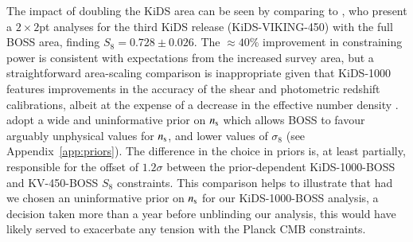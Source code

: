 The impact of doubling the KiDS area can be seen by comparing to \citet{troester/etal:2020}, who present a $2\times2$pt analyses for the third KiDS release (KiDS-VIKING-450) with the full BOSS area, finding $S_8 = 0.728 \pm 0.026$.   The $\approx\!40\%$ improvement in constraining power is consistent with expectations from the increased survey area, but a straightforward area-scaling comparison is inappropriate given that KiDS-1000 features improvements in the accuracy of the shear and photometric redshift calibrations, albeit at the expense of a decrease in the effective number density \citep[see][for details]{giblin/etal:inprep}.  
\citet{troester/etal:2020} adopt a wide and uninformative prior on $n_{\rm s}$ which allows BOSS to favour arguably unphysical values for $n_{\rm s}$, and lower values of $\sigma_8$ (see Appendix~\ref{app:priors}).   
The difference in the choice in priors is, at least partially, responsible for the offset of $1.2\sigma$ between the prior-dependent KiDS-1000-BOSS and KV-450-BOSS $S_8$ constraints. 
This comparison helps to illustrate that had we chosen an uninformative prior on $n_{\rm s}$ for our KiDS-1000-BOSS analysis, a decision taken more than a year before unblinding our analysis, this would have likely served to exacerbate any tension with the Planck CMB constraints. 















